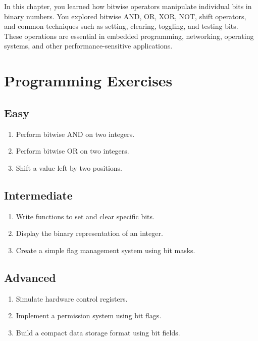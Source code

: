 \documentclass[12pt,openany]{book}
\begin{document}
In this chapter, you learned how bitwise operators manipulate individual bits in binary numbers. You explored bitwise AND, OR, XOR, NOT, shift operators, and common techniques such as setting, clearing, toggling, and testing bits. These operations are essential in embedded programming, networking, operating systems, and other performance-sensitive applications.

\section{Programming Exercises}

\subsection*{Easy}

\begin{enumerate}
    \item Perform bitwise AND on two integers.
    \item Perform bitwise OR on two integers.
    \item Shift a value left by two positions.
\end{enumerate}

\subsection*{Intermediate}

\begin{enumerate}
    \item Write functions to set and clear specific bits.
    \item Display the binary representation of an integer.
    \item Create a simple flag management system using bit masks.
\end{enumerate}

\subsection*{Advanced}

\begin{enumerate}
    \item Simulate hardware control registers.
    \item Implement a permission system using bit flags.
    \item Build a compact data storage format using bit fields.
\end{enumerate}
\end{document}
